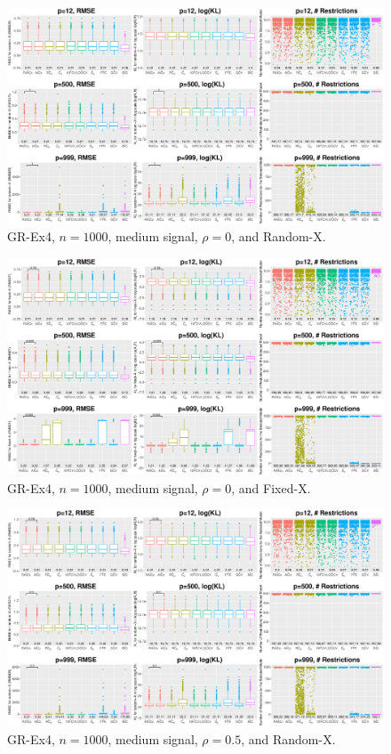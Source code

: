 \clearpage
\begin{figure}[!ht]
\centering
\includegraphics[width=\textwidth]{figures/supplement/randomx_GR-Ex4_n1000_msnr_rho0.eps}
\caption{GR-Ex4, $n=1000$, medium signal, $\rho=0$, and Random-X.}
\end{figure}
\begin{figure}[!ht]
\centering
\includegraphics[width=\textwidth]{figures/supplement/fixedx_GR-Ex4_n1000_msnr_rho0.eps}
\caption{GR-Ex4, $n=1000$, medium signal, $\rho=0$, and Fixed-X.}
\end{figure}
\clearpage
\begin{figure}[!ht]
\centering
\includegraphics[width=\textwidth]{figures/supplement/randomx_GR-Ex4_n1000_msnr_rho05.eps}
\caption{GR-Ex4, $n=1000$, medium signal, $\rho=0.5$, and Random-X.}
\end{figure}

